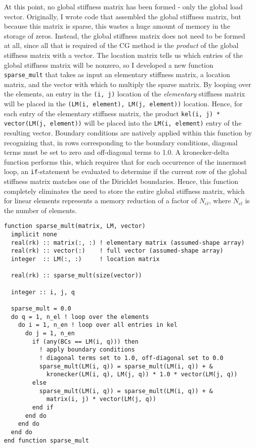 \documentclass[10pt]{article}
\begin{document}
At this point, no global stiffness matrix has been formed - only the global load vector. Originally, I wrote code that assembled the global stiffness matrix, but because this matrix is sparse, this wastes a huge amount of memory in the storage of zeros. Instead, the global stiffness matrix does not need to be formed at all, since all that is required of the CG method is the {\it product} of the global stiffness matrix with a vector. The location matrix tells us which entries of the global stiffness matrix will be nonzero, so I developed a new function {\tt sparse\_mult} that takes as input an elementary stiffness matrix, a location matrix, and the vector with which to multiply the sparse matrix. By looping over the elements, an entry in the {\tt (i, j)} location of the {\it elementary} stiffness matrix will be placed in the {\tt (LM(i, element), LM(j, element))} location. Hence, for each entry of the elementary stiffness matrix, the product {\tt kel(i, j) * vector(LM(j, element))} will be placed into the {\tt LM(i, element)} entry of the resulting vector. Boundary conditions are natively applied within this function by recognizing that, in rows corresponding to the boundary conditions, diagonal terms must be set to zero and off-diagonal terms to 1.0. A kronecker-delta function performs this, which requires that for each occurrence of the innermost loop, an {\tt if}-statement be evaluated to determine if the current row of the global stiffness matrix matches one of the Dirichlet boundaries. Hence, this function completely eliminates the need to store the entire global stiffness matrix, which for linear elements represents a memory reduction of a factor of \(N_{el}\), where \(N_{el}\) is the number of elements. 

\begin{lstlisting}
function sparse_mult(matrix, LM, vector)
  implicit none
  real(rk) :: matrix(:, :) ! elementary matrix (assumed-shape array)
  real(rk) :: vector(:)    ! full vector (assumed-shape array)
  integer  :: LM(:, :)     ! location matrix

  real(rk) :: sparse_mult(size(vector))

  integer :: i, j, q
  
  sparse_mult = 0.0
  do q = 1, n_el ! loop over the elements
    do i = 1, n_en ! loop over all entries in kel
      do j = 1, n_en
        if (any(BCs == LM(i, q))) then
          ! apply boundary conditions
          ! diagonal terms set to 1.0, off-diagonal set to 0.0
          sparse_mult(LM(i, q)) = sparse_mult(LM(i, q)) + & 
            kronecker(LM(i, q), LM(j, q)) * 1.0 * vector(LM(j, q))
        else
          sparse_mult(LM(i, q)) = sparse_mult(LM(i, q)) + &
            matrix(i, j) * vector(LM(j, q))
        end if
      end do
    end do
  end do
end function sparse_mult
\end{lstlisting}
\end{document}
